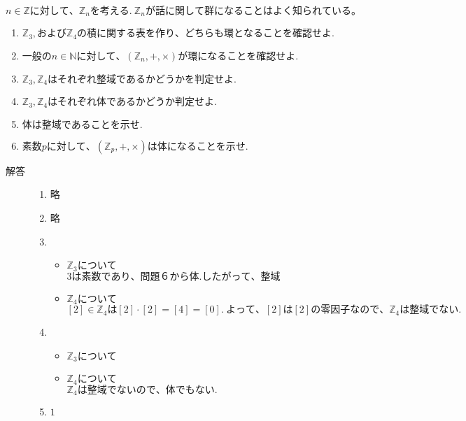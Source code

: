 \documentclass[dvipdfmx]{jsarticle}
\begin{document}
\begin{tcolorbox}[colframe=black!50,colback=white,colbacktitle=black!50,coltitle=white,fonttitle=\bfseries\sffamily,title=問題１]
$n \in \mathbb{Z}に対して、\mathbb{Z}_nを考える. \ \mathbb{Z}_nが話に関して群になることはよく知られている。$
\begin{enumerate}
  \item $\mathbb{Z}_3,および\mathbb{Z}_4の積に関する表を作り、どちらも環となることを確認せよ.$
  \item $一般のn \in \mathbb{N}に対して、(\mathbb{Z}_n, +, \times)が環になることを確認せよ.$
  \item $\mathbb{Z}_3,\mathbb{Z}_4はそれぞれ整域であるかどうかを判定せよ.$
  \item $\mathbb{Z}_3, \mathbb{Z}_4はそれぞれ体であるかどうか判定せよ.$
  \item $体は整域であることを示せ.$
  \item $素数pに対して、(\mathbb{Z}_p, +, \times)は体になることを示せ.$
\end{enumerate}
\end{tcolorbox}

\begin{description}
  \item[解答] \mbox{}
  \begin{enumerate}
    \item 略

    \item 略

    \item
    \begin{itemize}
      \item $\mathbb{Z}_3について$\\
      $3は素数であり、問題６から体.したがって、整域$

      \item $\mathbb{Z}_4について$\\
      $[2] \in \mathbb{Z}_4は[2] \cdot [2] = [4] = [0]. \ よって、[2]は[2]の零因子なので、\mathbb{Z}_4は整域でない.$

    \end{itemize}

    \item
    \begin{itemize}
      \item $\mathbb{Z}_3について$

      \item $\mathbb{Z}_4について$\\
      $\mathbb{Z}_4は整域でないので、体でもない.$

    \end{itemize}

    \item $1$
  \end{enumerate}
\end{description}
\end{document}
